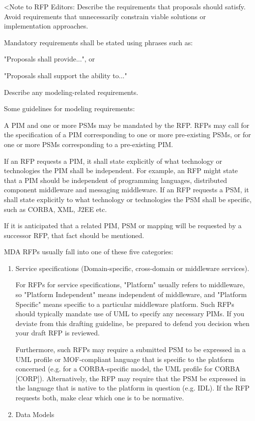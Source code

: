 
\begin{itshape}
\color{red}<Note to RFP Editors: Describe the requirements that proposals should satisfy. Avoid requirements that unnecessarily constrain viable solutions or implementation approaches. 

Mandatory requirements shall be stated using phrases such as:

"Proposals shall provide...", or

"Proposals shall support the ability to..."

Describe any modeling-related requirements.

Some guidelines for modeling requirements:

A PIM and one or more PSMs may be mandated by the RFP. RFPs may call for the specification of a PIM corresponding to one or more pre-existing PSMs, or for one or more PSMs corresponding to a pre-existing PIM. 

If an RFP requests a PIM, it shall state explicitly of what technology or technologies the PIM shall be independent. For example, an RFP might state that a PIM should be independent of programming languages, distributed component middleware and messaging middleware. If an RFP requests a PSM, it shall state explicitly to what technology or technologies the PSM shall be specific, such as CORBA, XML, J2EE etc.

If it is anticipated that a related PIM, PSM or mapping will be requested by a successor RFP, that fact should be mentioned.

MDA RFPs usually fall into one of these five categories:
\begin{enumerate}
\item Service specifications (Domain-specific, cross-domain or middleware services).

For RFPs for service specifications, "Platform" usually refers to middleware, so "Platform Independent" means independent of middleware, and "Platform Specific" means specific to a particular middleware platform. Such RFPs should typically mandate use of UML to specify any necessary PIMs. If you deviate from this drafting guideline, be prepared to defend you decision when your draft RFP is reviewed.

Furthermore, such RFPs may require a submitted PSM to be expressed in a UML profile or MOF-compliant language that is specific to the platform concerned (e.g. for a CORBA-specific model, the UML profile for CORBA [CORP]). Alternatively, the RFP may require that the PSM be expressed in the language that is native to the platform in question (e.g. IDL). If the RFP requests both, make clear which one is to be normative.
\item Data Models


\end{enumerate}
\end{itshape}
